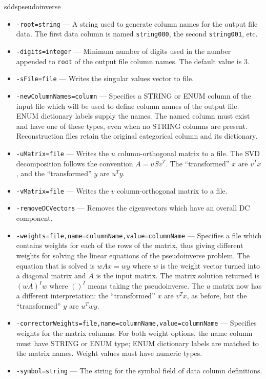 \begin{sddsprog}{sddspseudoinverse}
\begin{itemize}
      \item \verb|-root=string| --- A string used to generate column names for the output file data. The first data column is named \verb|string000|, the second \verb|string001|, etc.
      \item \verb|-digits=integer| --- Minimum number of digits used in the number appended to \verb|root| of the output file column names. The default value is 3.
      \item \verb|-sFile=file| --- Writes the singular values vector to file.
      \item \verb|-newColumnNames=column| --- Specifies a STRING or ENUM column of the input file which will be used to define column names of the output file. ENUM dictionary labels supply the names. The named column must exist and have one of these types, even when no STRING columns are present. Reconstruction files retain the original categorical column and its dictionary.
      \item \verb|-uMatrix=file| --- Writes the $u$ column-orthogonal matrix to a file. The SVD decomposition follows the convention $A = u S v^T$. The ``transformed'' $x$ are $v^T x$, and the ``transformed'' $y$ are $u^T y$.
      \item \verb|-vMatrix=file| --- Writes the $v$ column-orthogonal matrix to a file.
      \item \verb|-removeDCVectors| --- Removes the eigenvectors which have an overall DC component.
      \item \verb|-weights=file,name=columnName,value=columnName| --- Specifies a file which contains weights for each of the rows of the matrix, thus giving different weights for solving the linear equations of the pseudoinverse problem. The equation that is solved is $wAx = wy$ where $w$ is the weight vector turned into a diagonal matrix and $A$ is the input matrix. The matrix solution returned is $(wA)^I w$ where $()^I$ means taking the pseudoinverse. The $u$ matrix now has a different interpretation: the ``transformed'' $x$ are $v^T x$, as before, but the ``transformed'' $y$ are $u^T w y$.
      \item \verb|-correctorWeights=file,name=columnName,value=columnName| --- Specifies weights for the matrix columns. For both weight options, the name column must have STRING or ENUM type; ENUM dictionary labels are matched to the matrix names. Weight values must have numeric types.
      \item \verb|-symbol=string| --- The string for the symbol field of data column definitions.

\end{itemize}
\end{sddsprog}
